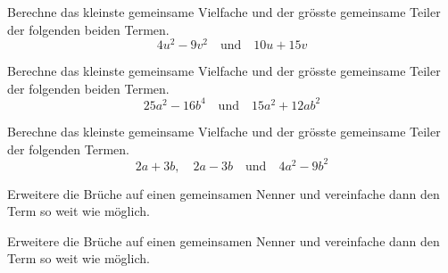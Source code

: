 \documentclass[11pt]{exam}
\begin{document}
\begin{questions}

\question[4]
Berechne das kleinste gemeinsame Vielfache und der grösste gemeinsame Teiler der folgenden beiden Termen.
\[4u^2-9v^2\quad\text{und}\quad 10u+15v\]

\question[4]
Berechne das kleinste gemeinsame Vielfache und der grösste gemeinsame Teiler der folgenden beiden Termen.
\[25a^2-16b^4\quad\text{und}\quad 15a^2+12ab^2\]


\question[4]
Berechne das kleinste gemeinsame Vielfache und der grösste gemeinsame Teiler der folgenden Termen.
\[2a+3b,\quad 2a-3b\quad\text{und}\quad 4a^2-9b^2\]


\question[6]
Erweitere die Brüche auf einen gemeinsamen Nenner und vereinfache dann den Term so weit wie möglich.

\question[6]
Erweitere die Brüche auf einen gemeinsamen Nenner und vereinfache dann den Term so weit wie möglich.
\end{questions}
\end{document}
